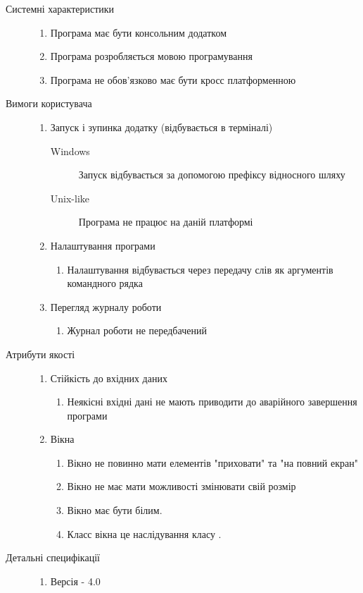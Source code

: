 \begin{description}
	\item[Системні характеристики]\directenv
		\begin{enumerate}
			\item Програма має бути консольним додатком
			\item Програма розробляється мовою програмування  
			\item Програма не обов'язково має бути кросс платформенною
		\end{enumerate}
	\item[Вимоги користувача]\directenv
		\begin{enumerate}
			\item Запуск і зупинка додатку (відбувається в терміналі)
				\begin{description}
					\item[Windows]
						Запуск відбувається за допомогою префіксу відносного шляху 
					\item[Unix-like]
						Програма не працює на даній платформі
				\end{description}
			\item Налаштування програми
				\begin{enumerate}
					\item Налаштування відбувається через передачу слів як аргументів командного рядка
				\end{enumerate}
			\item Перегляд журналу роботи
				\begin{enumerate}
					\item Журнал роботи не передбачений
				\end{enumerate}
		\end{enumerate}
	\item[Атрибути якості]\directenv
		\begin{enumerate}
			\item Стійкість до вхідних даних
				\begin{enumerate}
					\item Неякісні вхідні дані не мають приводити до аварійного завершення програми
				\end{enumerate}
			\item Вікна
				\begin{enumerate}
					\item Вікно не повинно мати елементів "приховати" та "на повний екран"
					\item Вікно не має мати можливості змінювати свій розмір
					\item Вікно має бути білим.
					\item Класс вікна  це наслідування класу .
				\end{enumerate}
		\end{enumerate}
	\item[Детальні специфікації]\directenv
		\begin{enumerate}
			\item Версія  - 4.0
		\end{enumerate}
\end{description}


